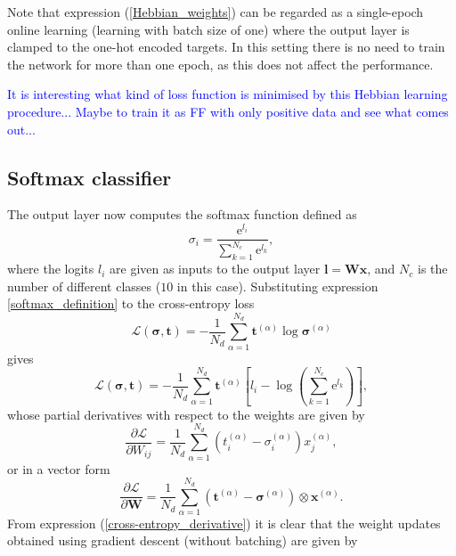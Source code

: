 \documentclass[a4paper, 11pt]{article}
\begin{document}
Note that expression (\ref{Hebbian_weights}) can be regarded as a single-epoch online learning (learning with batch size of one) where the output layer is clamped to the one-hot encoded targets. In this setting there is no need to train the network for more than one epoch, as this does not affect the performance.

\textcolor{blue}{It is interesting what kind of loss function is minimised by this Hebbian learning procedure... Maybe to train it as FF with only positive data and see what comes out...}

\subsection{Softmax classifier}
The output layer now computes the softmax function defined as
\begin{equation} \label{softmax_definition}
  \sigma_i = \frac{\mathrm e^{l_i}}{\sum_{k=1}^{N_c}\mathrm e^{l_k}}, 
\end{equation}
where the logits $l_i$ are given as inputs to the output layer $\mathbf l = \mathbf W \mathbf x$, and $N_c$ is the number of different classes ($10$ in this case). Substituting expression \ref{softmax_definition} to the cross-entropy loss
\begin{equation}
  \mathcal L(\boldsymbol\sigma, \mathbf t) = -\frac{1}{{N_d}}\sum_{\alpha=1}^{N_d}\mathbf t^{(\alpha)}\log\boldsymbol\sigma^{(\alpha)}
\end{equation}
gives
\begin{equation*}
  \mathcal L(\boldsymbol\sigma, \mathbf t) = -\frac{1}{{N_d}}\sum_{\alpha=1}^{N_d}\mathbf t^{(\alpha)}\left[l_i - \log\left(\sum_{k=1}^{N_c}\mathrm e^{l_k}\right)\right],
\end{equation*}
whose partial derivatives with respect to the weights are given by
\begin{equation}
  \frac{\partial \mathcal L}{\partial W_{ij}} = \frac{1}{{N_d}}\sum_{\alpha=1}^{N_d}\left(t_i^{(\alpha)} - \sigma_i^{(\alpha)}\right)x_j^{(\alpha)},
\end{equation}
or in a vector form
\begin{equation}\label{cross-entropy_derivative}
  \frac{\partial \mathcal L}{\partial \mathbf W} = \frac{1}{{N_d}}\sum_{\alpha=1}^{N_d}\left(\mathbf t^{(\alpha)} - \boldsymbol\sigma^{(\alpha)}\right)\otimes\mathbf x^{(\alpha)}.
\end{equation}
From expression (\ref{cross-entropy_derivative}) it is clear that the weight updates obtained using gradient descent (without batching) are given by
\end{document}

